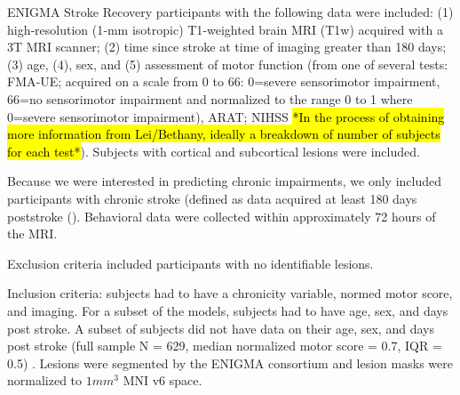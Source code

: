 \documentclass[10pt]{article}
\begin{document}
ENIGMA Stroke Recovery participants with the following data were included: (1) high‐resolution (1‐mm isotropic) T1‐weighted brain MRI (T1w) acquired with a 3T MRI scanner; (2) time since stroke at time of imaging greater than 180 days; (3) age, (4), sex, and (5) assessment of motor function (from one of several tests: FMA‐UE; acquired on a scale from 0 to 66: 0=severe sensorimotor impairment, 66=no sensorimotor impairment and normalized to the range 0 to 1 where 0=severe sensorimotor impairment), ARAT; NIHSS \hl{*In the process of obtaining more information from Lei/Bethany, ideally a breakdown of number of subjects for each test*}). Subjects with cortical and subcortical lesions were included. 



Because we were interested in predicting chronic impairments, we only included participants with chronic stroke (defined as data acquired at least 180 days poststroke (\cite{Bernhardt2017-av}). Behavioral data were collected within approximately 72 hours of the MRI. 


Exclusion criteria included participants with no identifiable lesions. 

Inclusion criteria: subjects had to have a chronicity variable, normed motor score, and imaging.
For a subset of the models, subjects had to have age, sex, and days post stroke. A subset of subjects did not have data on their age, sex, and days post stroke (full sample N = 629, median normalized motor score = 0.7, IQR = 0.5) .
Lesions were segmented by the ENIGMA consortium and lesion masks were normalized to $1mm^3$ MNI v6 space. 
\end{document}
